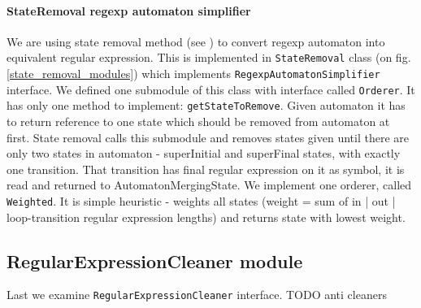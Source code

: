 \documentclass[a4paper,10pt,oneside]{article}
\newcommand{\code}[1]{\texttt{#1}}
\begin{document}
\paragraph{StateRemoval regexp automaton simplifier}
We are using state removal method (see \cite{1224321}) to convert regexp automaton into equivalent regular expression.
This is implemented in \code{StateRemoval} class (on fig. \ref{state_removal_modules}) which implements \code{RegexpAutomatonSimplifier} interface.
We defined one submodule of this class with interface called \code{Orderer}.
It has only one method to implement: \code{getStateToRemove}.
Given automaton it has to return reference to one state which should be removed from automaton at first.
State removal calls this submodule and removes states given until there are only two states in automaton - superInitial and superFinal states,
with exactly one transition.
That transition has final regular expression on it as symbol, it is read and returned to AutomatonMergingState.
We implement one orderer, called \code{Weighted}.
It is simple heuristic - weights all states (weight = sum of {in | out | loop}-transition regular expression lengths) and returns state with lowest weight.

\subsection{RegularExpressionCleaner module}
Last we examine \code{RegularExpressionCleaner} interface.
TODO anti cleaners
\end{document}
